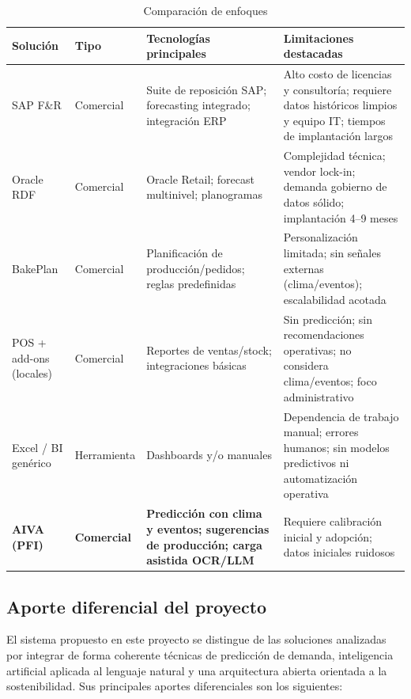\begin{table}[t]
    \centering
    \renewcommand{\arraystretch}{1.3}
    \caption{Comparación de enfoques}
    \label{tab:comparacion}
    \begin{tabular}{|p{2.9cm}|p{2cm}|p{3cm}|p{5cm}|}
        \hline
        \textbf{Solución} & \textbf{Tipo} & \textbf{Tecnologías principales} & \textbf{Limitaciones destacadas} \\
        \hline
        SAP F\&R & Comercial & Suite de reposición SAP; forecasting integrado; integración ERP & Alto costo de licencias y consultoría; requiere datos históricos limpios y equipo IT; tiempos de implantación largos \\
        \hline
        Oracle RDF & Comercial  & Oracle Retail; forecast multinivel; planogramas & Complejidad técnica; vendor lock-in; demanda gobierno de datos sólido; implantación 4–9 meses \\
        \hline
        BakePlan & Comercial  & Planificación de producción/pedidos; reglas predefinidas & Personalización limitada; sin señales externas (clima/eventos); escalabilidad acotada \\
        \hline
        POS + add-ons (locales) & Comercial  & Reportes de ventas/stock; integraciones básicas & Sin predicción; sin recomendaciones operativas; no considera clima/eventos; foco administrativo \\
        \hline
        Excel / BI genérico & Herramienta & Dashboards y/o manuales & Dependencia de trabajo manual; errores humanos; sin modelos predictivos ni automatización operativa \\
        \hline
        \textbf{AIVA (PFI)} & \textbf{Comercial} & \textbf{Predicción con clima y eventos; sugerencias de producción; carga asistida OCR/LLM} & Requiere calibración inicial y adopción; datos iniciales ruidosos \\
        \hline
    \end{tabular}
\end{table}



\subsection{Aporte diferencial del proyecto}

El sistema propuesto en este proyecto se distingue de las soluciones analizadas por integrar de forma coherente técnicas de predicción de demanda, inteligencia artificial aplicada al lenguaje natural y una arquitectura abierta orientada a la sostenibilidad. Sus principales aportes diferenciales son los siguientes:

